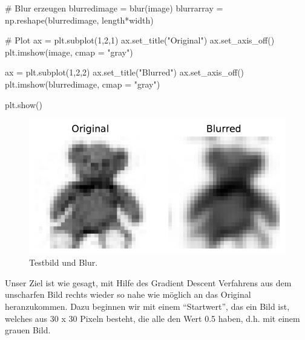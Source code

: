 \documentclass[
  a4paper,
  DIV=11]{scrreprt}
\newenvironment{Shaded}{\begin{snugshade}}{\end{snugshade}}
\newcommand{\CommentTok}[1]{\textcolor[rgb]{0.37,0.37,0.37}{#1}}
\newcommand{\DecValTok}[1]{\textcolor[rgb]{0.68,0.00,0.00}{#1}}
\newcommand{\NormalTok}[1]{\textcolor[rgb]{0.00,0.23,0.31}{#1}}
\newcommand{\OperatorTok}[1]{\textcolor[rgb]{0.37,0.37,0.37}{#1}}
\newcommand{\StringTok}[1]{\textcolor[rgb]{0.13,0.47,0.30}{#1}}
\theoremstyle{definition}
\theoremstyle{definition}
\theoremstyle{remark}
\begin{document}
\begin{Shaded}
\begin{Highlighting}[]
\CommentTok{\# Blur erzeugen}
\NormalTok{blurredimage }\OperatorTok{=}\NormalTok{ blur(image)}
\NormalTok{blurrarray }\OperatorTok{=}\NormalTok{ np.reshape(blurredimage, length}\OperatorTok{*}\NormalTok{width)}

\CommentTok{\# Plot}
\NormalTok{ax }\OperatorTok{=}\NormalTok{ plt.subplot(}\DecValTok{1}\NormalTok{,}\DecValTok{2}\NormalTok{,}\DecValTok{1}\NormalTok{)}
\NormalTok{ax.set\_title(}\StringTok{"Original"}\NormalTok{)}
\NormalTok{ax.set\_axis\_off()}
\NormalTok{plt.imshow(image, cmap }\OperatorTok{=} \StringTok{"gray"}\NormalTok{)}

\NormalTok{ax }\OperatorTok{=}\NormalTok{ plt.subplot(}\DecValTok{1}\NormalTok{,}\DecValTok{2}\NormalTok{,}\DecValTok{2}\NormalTok{)}
\NormalTok{ax.set\_title(}\StringTok{"Blurred"}\NormalTok{)}
\NormalTok{ax.set\_axis\_off()}
\NormalTok{plt.imshow(blurredimage, cmap }\OperatorTok{=} \StringTok{"gray"}\NormalTok{)}

\NormalTok{plt.show()}
\end{Highlighting}
\end{Shaded}

\begin{figure}[H]

{\centering \includegraphics{aad_files/figure-pdf/fig-testbildmitblur-output-1.pdf}

}

\caption{\label{fig-testbildmitblur}Testbild und Blur.}

\end{figure}

Unser Ziel ist wie gesagt, mit Hilfe des Gradient Descent Verfahrens aus
dem unscharfen Bild rechts wieder so nahe wie möglich an das Original
heranzukommen. Dazu beginnen wir mit einem ``Startwert'', das ein Bild
ist, welches aus 30 x 30 Pixeln besteht, die alle den Wert 0.5 haben,
d.h. mit einem grauen Bild.
\end{document}
